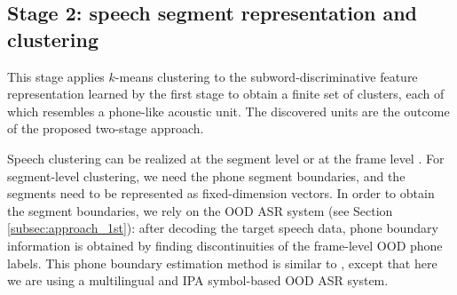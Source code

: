 \documentclass[a4paper]{article}
\begin{document}



     

\subsection{Stage 2: speech segment representation and clustering}
\label{subsec:approach_2nd_stage}
This stage applies $k$-means clustering to the subword-discriminative feature representation learned by the first stage to obtain a finite set of clusters, each of which resembles a phone-like acoustic unit. The discovered units are the outcome of the proposed two-stage approach.  

Speech clustering can be realized at the segment level \cite{LeeSoongJuang} or at the frame level   \cite{chen2015parallel}.  
For segment-level clustering, we need the phone segment boundaries, and the segments need to be  represented as fixed-dimension vectors. In order to obtain the segment boundaries,  we rely on the OOD ASR system (see Section \ref{subsec:approach_1st}):  after decoding the  target speech data, phone boundary information is obtained by finding discontinuities of the frame-level OOD phone labels. This phone boundary estimation method is similar to \cite{feng2016exploit}, except that here we are using a multilingual and  IPA symbol-based OOD ASR system.
\end{document}
